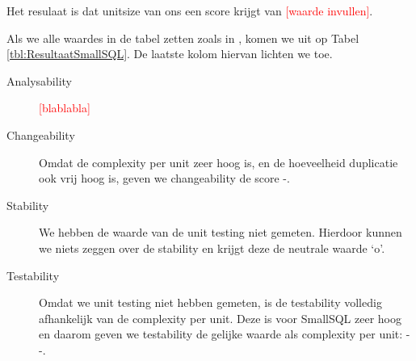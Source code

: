 \documentclass[a4paper]{article}
\newcommand{\todo}[1]{\textcolor{red}{[#1]}}
\begin{document}
Het resulaat is dat unitsize van ons een score krijgt van \todo{waarde invullen}.

Als we alle waardes in de tabel zetten zoals in \cite{A}, komen we uit op Tabel \ref{tbl:ResultaatSmallSQL}. De laatste kolom hiervan lichten we toe.
\begin{description}
\item[Analysability] \todo{blablabla}
\item[Changeability] Omdat de complexity per unit zeer hoog is, en de hoeveelheid duplicatie ook vrij hoog is, geven we changeability de score -.
\item[Stability] We hebben de waarde van de unit testing niet gemeten. Hierdoor kunnen we niets zeggen over de stability en krijgt deze de neutrale waarde `o'.
\item[Testability] Omdat we unit testing niet hebben gemeten, is de testability volledig afhankelijk van de complexity per unit. Deze is voor SmallSQL zeer hoog en daarom geven we testability de gelijke waarde als complexity per unit: - -.
\end{description}
\end{document}
